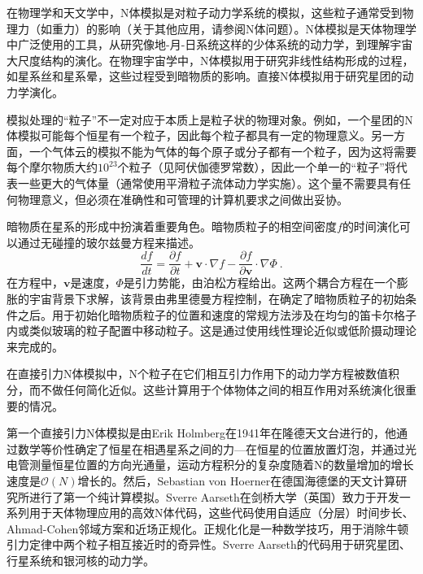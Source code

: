 
\begin{issues}
\issueDraft
\end{issues}


在物理学和天文学中，N体模拟是对粒子动力学系统的模拟，这些粒子通常受到物理力（如重力）的影响（关于其他应用，请参阅N体问题）。N体模拟是天体物理学中广泛使用的工具，从研究像地-月-日系统这样的少体系统的动力学，到理解宇宙大尺度结构的演化。在物理宇宙学中，N体模拟用于研究非线性结构形成的过程，如星系丝和星系晕，这些过程受到暗物质的影响。直接N体模拟用于研究星团的动力学演化。

模拟处理的“粒子”不一定对应于本质上是粒子状的物理对象。例如，一个星团的N体模拟可能每个恒星有一个粒子，因此每个粒子都具有一定的物理意义。另一方面，一个气体云的模拟不能为气体的每个原子或分子都有一个粒子，因为这将需要每个摩尔物质大约$10^{23}$个粒子（见阿伏伽德罗常数），因此一个单一的“粒子”将代表一些更大的气体量（通常使用平滑粒子流体动力学实施）。这个量不需要具有任何物理意义，但必须在准确性和可管理的计算机要求之间做出妥协。

暗物质在星系的形成中扮演着重要角色。暗物质粒子的相空间密度$f$的时间演化可以通过无碰撞的玻尔兹曼方程来描述。
\begin{equation}
\frac{df}{dt} = \frac{\partial f}{\partial t} + \mathbf v\cdot \nabla f - \frac{\partial f}{\partial \mathbf v}\cdot \nabla \Phi~. 
\end{equation}
在方程中，$\mathbf v$是速度，$\Phi$是引力势能，由泊松方程给出。这两个耦合方程在一个膨胀的宇宙背景下求解，该背景由弗里德曼方程控制，在确定了暗物质粒子的初始条件之后。用于初始化暗物质粒子的位置和速度的常规方法涉及在均匀的笛卡尔格子内或类似玻璃的粒子配置中移动粒子。这是通过使用线性理论近似或低阶摄动理论来完成的。

在直接引力N体模拟中，N个粒子在它们相互引力作用下的动力学方程被数值积分，而不做任何简化近似。这些计算用于个体物体之间的相互作用对系统演化很重要的情况。

第一个直接引力N体模拟是由Erik Holmberg在1941年在隆德天文台进行的，他通过数学等价性确定了恒星在相遇星系之间的力—在恒星的位置放置灯泡，并通过光电管测量恒星位置的方向光通量，运动方程积分的复杂度随着N的数量增加的增长速度是$\mathcal O(N)$增长的。然后，Sebastian von Hoerner在德国海德堡的天文计算研究所进行了第一个纯计算模拟。Sverre Aarseth在剑桥大学（英国）致力于开发一系列用于天体物理应用的高效N体代码，这些代码使用自适应（分层）时间步长、Ahmad-Cohen邻域方案和近场正规化。正规化化是一种数学技巧，用于消除牛顿引力定律中两个粒子相互接近时的奇异性。Sverre Aarseth的代码用于研究星团、行星系统和银河核的动力学。

